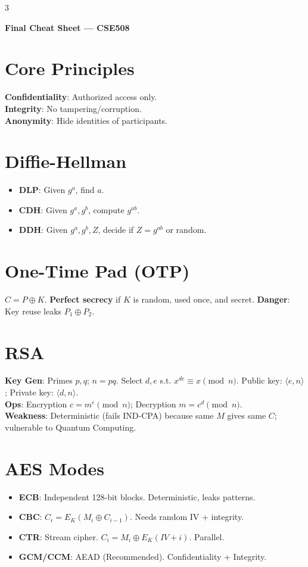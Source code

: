 \documentclass[10pt,landscape]{article}
\begin{document}
\begin{multicols*}{3}

\begin{center}
    \textbf{\large Final Cheat Sheet --- CSE508}
\end{center}

\section*{Core Principles}
\textbf{Confidentiality}: Authorized access only. \\
\textbf{Integrity}: No tampering/corruption. \\
\textbf{Anonymity}: Hide identities of participants.

\section*{Diffie-Hellman}
\begin{itemize}
    \item \textbf{DLP}: Given $g^a$, find $a$.
    \item \textbf{CDH}: Given $g^a, g^b$, compute $g^{ab}$.
    \item \textbf{DDH}: Given $g^a, g^b, Z$, decide if $Z=g^{ab}$ or random.
\end{itemize}

\section*{One-Time Pad (OTP)}
$C = P \oplus K$. \textbf{Perfect secrecy} if $K$ is random, used once, and secret. \textbf{Danger}: Key reuse leaks $P_1 \oplus P_2$.

\section*{RSA}
\textbf{Key Gen}: Primes $p,q$; $n=pq$. Select $d,e$ s.t. $x^{de} \equiv x \pmod n$. Public key: $\langle e, n \rangle$; Private key: $\langle d, n \rangle$. \\
\textbf{Ops}: Encryption $c = m^e \pmod n$; Decryption $m = c^d \pmod n$. \\
\textbf{Weakness}: Deterministic (fails IND-CPA) because same $M$ gives same $C$; vulnerable to Quantum Computing.

\section*{AES Modes}
\begin{itemize}
    \item \textbf{ECB}: Independent 128-bit blocks. Deterministic, leaks patterns.
    \item \textbf{CBC}: $C_i = E_K(M_i \oplus C_{i-1})$. Needs random IV + integrity.
    \item \textbf{CTR}: Stream cipher. $C_i = M_i \oplus E_K(IV+i)$. Parallel.
    \item \textbf{GCM/CCM}: AEAD (Recommended). Confidentiality + Integrity.
\end{itemize}


\end{multicols*}
\end{document}
